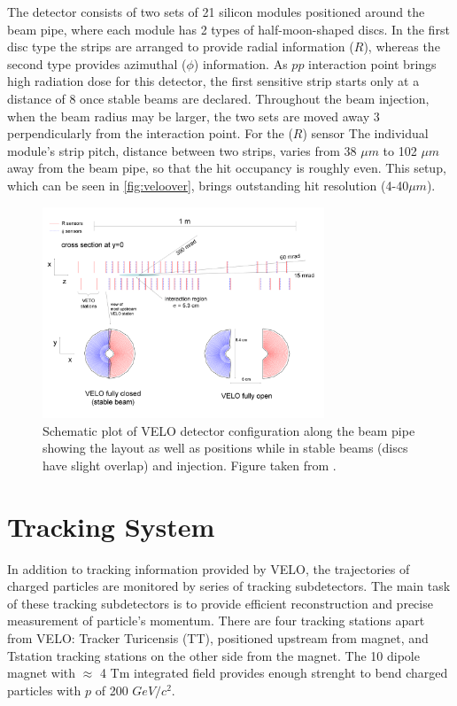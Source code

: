  The detector consists of two sets of 21 silicon modules positioned around the beam pipe, where each module has 2 types of half-moon-shaped discs. In the first disc type the strips are arranged to provide radial information ($R$), whereas the second type provides azimuthal ($\phi$) information. As $pp$ interaction point brings high radiation dose for this detector, the first sensitive strip starts only at a distance of 8 \mm once stable beams are declared. Throughout the beam injection, when the beam radius may be larger, the two sets are moved away 3 \cm perpendicularly from the interaction point. For the ($R$) sensor The individual module's strip pitch, distance between two strips, varies from 38 $\mu m$ to 102 $\mu m$ away from the beam pipe, so that the hit occupancy is roughly even. This setup, which can be seen in \autoref{fig:veloover}, brings outstanding hit resolution (4-40$\mu m$). 

\begin{figure}[!h]
	\centering
	\includegraphics[width = 0.75\textwidth]{figs/detector/veloOverview.png}
	\caption{ Schematic plot of \Gls{VELO} detector configuration along the beam pipe showing the layout as well as positions while in stable beams (discs have slight overlap) and injection. Figure taken from \cite{det_paper}.}
	\label{fig:veloover}
\end{figure}


\section{Tracking System}
In addition to tracking information provided by \Gls{VELO}, the trajectories of charged particles are monitored by series of tracking subdetectors. The main task of these tracking subdetectors is to provide efficient reconstruction and precise measurement of particle's momentum. There are four tracking stations apart from \Gls{VELO}: Tracker Turicensis (\Gls{TT}), positioned upstream from magnet, and  \Gls{Tstation} tracking stations on the other side from the magnet. The 10 \m dipole magnet with $\approx$ 4 Tm integrated field provides enough strenght to bend charged particles with $p$ of 200 $GeV/c^{2}$.      

